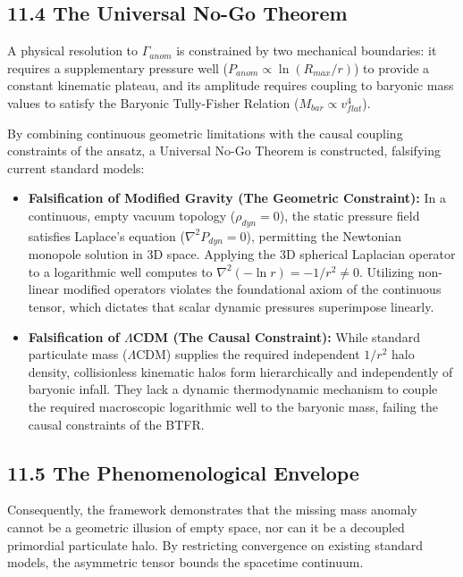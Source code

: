 \subsection*{11.4 The Universal No-Go Theorem} 
A physical resolution to $\Gamma_{anom}$ is constrained by two mechanical boundaries: it requires a supplementary pressure well ($P_{anom} \propto \ln(R_{max}/r)$) to provide a constant kinematic plateau, and its amplitude requires coupling to baryonic mass values to satisfy the Baryonic Tully-Fisher Relation ($M_{bar} \propto v_{flat}^4$).

By combining continuous geometric limitations with the causal coupling constraints of the ansatz, a Universal No-Go Theorem is constructed, falsifying current standard models: 
\begin{itemize} 
    \item \textbf{Falsification of Modified Gravity (The Geometric Constraint):} In a continuous, empty vacuum topology ($\rho_{dyn} = 0$), the static pressure field satisfies Laplace's equation ($\nabla^2 P_{dyn} = 0$), permitting the Newtonian monopole solution in 3D space. Applying the 3D spherical Laplacian operator to a logarithmic well computes to $\nabla^2 (-\ln r) = -1/r^2 \neq 0$. Utilizing non-linear modified operators violates the foundational axiom of the continuous tensor, which dictates that scalar dynamic pressures superimpose linearly. 
    \item \textbf{Falsification of $\Lambda$CDM (The Causal Constraint):} While standard particulate mass ($\Lambda$CDM) supplies the required independent $1/r^2$ halo density, collisionless kinematic halos form hierarchically and independently of baryonic infall. They lack a dynamic thermodynamic mechanism to couple the required macroscopic logarithmic well to the baryonic mass, failing the causal constraints of the BTFR. 
\end{itemize}

\subsection*{11.5 The Phenomenological Envelope} 
Consequently, the framework demonstrates that the missing mass anomaly cannot be a geometric illusion of empty space, nor can it be a decoupled primordial particulate halo. By restricting convergence on existing standard models, the asymmetric tensor bounds the spacetime continuum.

